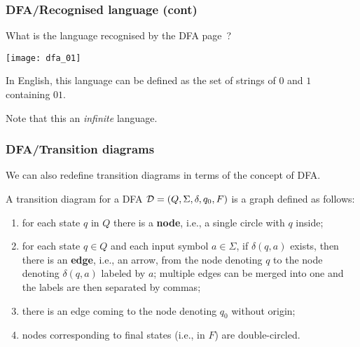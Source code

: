 % 
\begin{frame}
\frametitle{DFA/Recognised language (cont)}

What is the language recognised by the DFA page~\pageref{dfa_01}?
\begin{center}
\texttt{[image: dfa\_01]}
\end{center} 
In English, this language can be defined as the set of strings of
\(0\) and \(1\) containing \(01\). 

\bigskip

Note that this an \emph{infinite} language.

\end{frame}

% 
\begin{frame}
\frametitle{DFA/Transition diagrams}
 
We can also redefine transition diagrams in terms of the concept of
DFA.

\bigskip

A transition diagram for a DFA \({\cal D} = (Q, \Sigma, \delta, q_0,
F)\) is a graph defined as follows:
\begin{enumerate}

  \item for each state \(q\) in \(Q\) there is a \textbf{node}, i.e., a
    single circle with \(q\) inside;

  \item for each state \(q \in Q\) and each input symbol \(a \in
    \Sigma\), if \(\delta (q, a)\) exists, then there is an
    \textbf{edge}, i.e., an arrow, from the node denoting \(q\) to the
    node denoting \(\delta (q, a)\) labeled by \(a\); multiple edges
    can be merged into one and the labels are then separated by
    commas;

  \item there is an edge coming to the node denoting \(q_0\) without
    origin;

  \item nodes corresponding to final states (i.e., in \(F\)) are
    double-circled.

\end{enumerate}

\end{frame}

